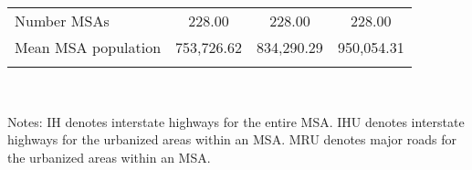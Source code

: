 \begin{center}
\begin{tabular}{lccc}
Number MSAs & 228.00 & 228.00 & 228.00\\
Mean MSA population & 753,726.62 & 834,290.29 & 950,054.31\\
\noalign{\smallskip}\hline\end{tabular}\\
\begin{footnotesize}Notes: IH denotes interstate highways for the entire MSA. IHU denotes interstate highways for the urbanized areas within an MSA. MRU denotes major roads for the urbanized areas within an MSA.\end{footnotesize}\\
\smallskip
\end{center}

